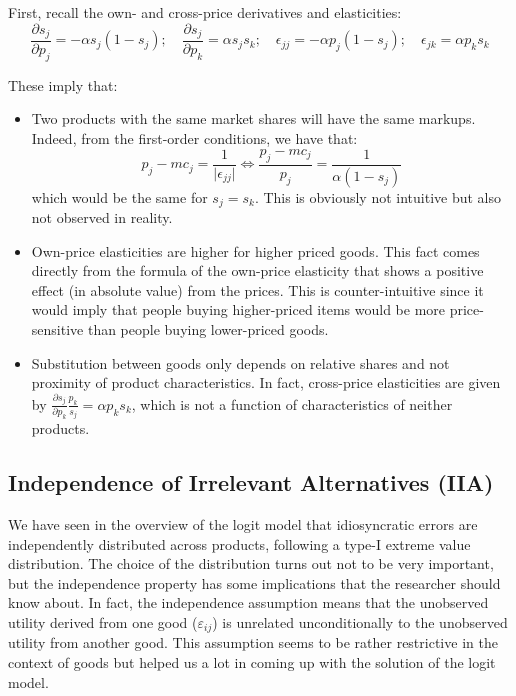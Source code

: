 \documentclass[12pt]{report}
\begin{document}
First, recall the own- and cross-price derivatives and elasticities:
$$ \frac{\partial s_j}{\partial p_j}  = -\alpha s_j (1 - s_j) ; \quad \frac{\partial s_j}{\partial p_k}  = \alpha s_j s_k ; \quad \epsilon_{jj}  = -\alpha p_j (1 - s_j) ; \quad \epsilon_{jk}  = \alpha p_k s_k $$

These imply that:
\begin{itemize}

\item Two products with the same market shares will have the same markups. Indeed, from the first-order conditions, we have that: $$p_j - mc_j = \frac{1}{\vert\epsilon_{jj}\vert} \Leftrightarrow \frac{p_j - mc_j}{p_j} = \frac{1}{\alpha(1 - s_j)} $$ which would be the same for $s_j = s_k$. This is obviously not intuitive but also not observed in reality. 

\item Own-price elasticities are higher for higher priced goods. This fact comes directly from the formula of the own-price elasticity that shows a positive effect (in absolute value) from the prices. This is counter-intuitive since it would imply that people buying higher-priced items would be more price-sensitive than people buying lower-priced goods.

\item Substitution between goods only depends on relative shares and not proximity of product characteristics. In fact, cross-price elasticities are given by $\frac{\partial s_j}{\partial p_k}\frac{p_k}{s_j} = \alpha p_k s_k $, which is not a function of characteristics of neither products.

\end{itemize}

\subsection{Independence of Irrelevant Alternatives (IIA)}\label{sssec:logitiia}

We have seen in the overview of the logit model that idiosyncratic errors are independently distributed across products, following a type-I extreme value distribution. The choice of the distribution turns out not to be very important, but the independence property has some implications that the researcher should know about. In fact, the independence assumption means that the unobserved utility derived from one good ($\varepsilon_{ij}$) is unrelated unconditionally to the unobserved utility from another good. This assumption seems to be rather restrictive in the context of goods but helped us a lot in coming up with the solution of the logit model.
\end{document}
